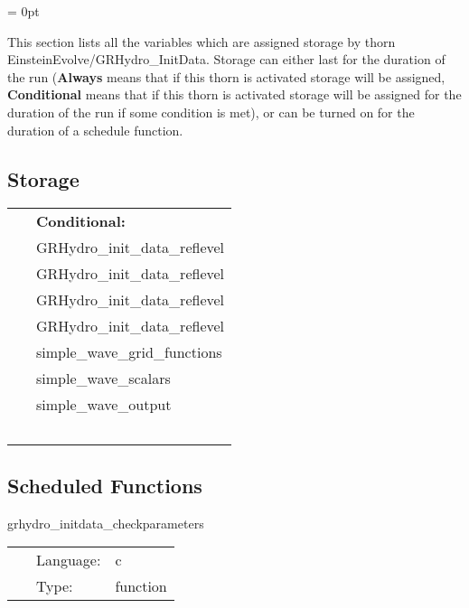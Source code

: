 \documentclass{article}
\begin{document}
\parskip = 0pt


\noindent This section lists all the variables which are assigned storage by thorn EinsteinEvolve/GRHydro\_InitData.  Storage can either last for the duration of the run ({\bf Always} means that if this thorn is activated storage will be assigned, {\bf Conditional} means that if this thorn is activated storage will be assigned for the duration of the run if some condition is met), or can be turned on for the duration of a schedule function.


\subsection*{Storage}

\hspace{5mm}

 \begin{tabular*}{160mm}{ll} 
~& {\bf Conditional:} \\ 
~ &  GRHydro\_init\_data\_reflevel\\ 
~ &  GRHydro\_init\_data\_reflevel\\ 
~ &  GRHydro\_init\_data\_reflevel\\ 
~ &  GRHydro\_init\_data\_reflevel\\ 
~ &  simple\_wave\_grid\_functions\\ 
~ &  simple\_wave\_scalars\\ 
~ &  simple\_wave\_output\\ 
~ & ~\\ 
\end{tabular*} 


\subsection*{Scheduled Functions}
\vspace{5mm}


\hspace{5mm} grhydro\_initdata\_checkparameters 

\hspace{5mm}{\it check parameters } 


\hspace{5mm}

 \begin{tabular*}{160mm}{cll} 
~ & Language:  & c \\ 
~ & Type:  & function \\ 
\end{tabular*} 
\end{document}
